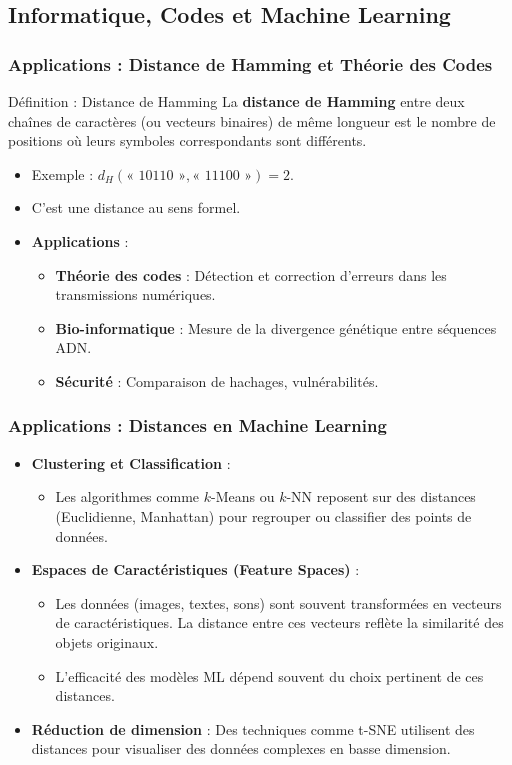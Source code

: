 \documentclass{beamer}
\begin{document}
\subsection*{Informatique, Codes et Machine Learning}
\begin{frame}
	\frametitle{Applications : Distance de Hamming et Théorie des Codes}
	\begin{block}{Définition : Distance de Hamming}
		La \textbf{distance de Hamming} entre deux chaînes de caractères (ou vecteurs binaires) de même longueur est le nombre de positions où leurs symboles correspondants sont différents.
	\end{block}
	\begin{itemize}
		\item Exemple : $d_H(\text{« 10110 »}, \text{« 11100 »}) = 2$.
		\item C'est une distance au sens formel.
		\item \textbf{Applications} :
		      \begin{itemize}
			      \item \textbf{Théorie des codes} : Détection et correction d'erreurs dans les transmissions numériques.
			      \item \textbf{Bio-informatique} : Mesure de la divergence génétique entre séquences ADN.
			      \item \textbf{Sécurité} : Comparaison de hachages, vulnérabilités.
		      \end{itemize}
	\end{itemize}
\end{frame}

\begin{frame}
	\frametitle{Applications : Distances en Machine Learning}
	\begin{itemize}
		\item \textbf{Clustering et Classification} :
		      \begin{itemize}
			      \item Les algorithmes comme $k$-Means ou $k$-NN reposent sur des distances (Euclidienne, Manhattan) pour regrouper ou classifier des points de données.
		      \end{itemize}
		\item \textbf{Espaces de Caractéristiques (Feature Spaces)} :
		      \begin{itemize}
			      \item Les données (images, textes, sons) sont souvent transformées en vecteurs de caractéristiques. La distance entre ces vecteurs reflète la similarité des objets originaux.
			      \item L'efficacité des modèles ML dépend souvent du choix pertinent de ces distances.
		      \end{itemize}
		\item \textbf{Réduction de dimension} : Des techniques comme t-SNE utilisent des distances pour visualiser des données complexes en basse dimension.
	\end{itemize}
\end{frame}
\end{document}
